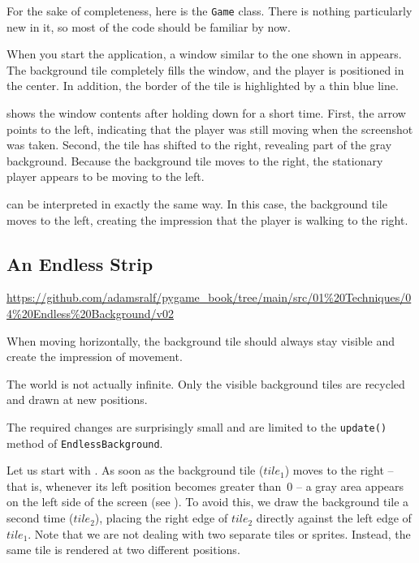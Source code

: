 For the sake of completeness, here is the \texttt{Game} class. There is nothing particularly new in it, so most of the code should be familiar by now.


When you start the application, a window similar to the one shown in  appears. The background tile completely fills the window, and the player is positioned in the center. In addition, the border of the tile is highlighted by a thin blue line.

 shows the window contents after holding down \keys{\arrowkeyleft} for a short time. First, the arrow points to the left, indicating that the player was still moving when the screenshot was taken. Second, the tile has shifted to the right, revealing part of the gray background. Because the background tile moves to the right, the stationary player appears to be moving to the left.

 can be interpreted in exactly the same way. In this case, the background tile moves to the left, creating the impression that the player is walking to the right.


\subsection{An Endless Strip}

\begin{diskbox}
	\url{https://github.com/adamsralf/pygame_book/tree/main/src/01%20Techniques/04%20Endless%20Background/v02}
\end{diskbox}

	When moving horizontally, the background tile should always stay visible and create the impression of movement.
\er

\begin{warningbox}
	The world is not actually infinite.	Only the visible background tiles are recycled and drawn at new positions.
\end{warningbox}

The required changes are surprisingly small and are limited to the \texttt{update()} method of \texttt{EndlessBackground}.

Let us start with . As soon as the background tile ($tile_1$) moves to the right -- that is, whenever its left position becomes greater than~0 -- a gray area appears on the left side of the screen (see ). To avoid this, we draw the background tile a second time ($tile_2$), placing the right edge of $tile_2$ directly against the left edge of $tile_1$. Note that we are not dealing with two separate tiles or sprites. Instead, the same tile is rendered at two different positions.


